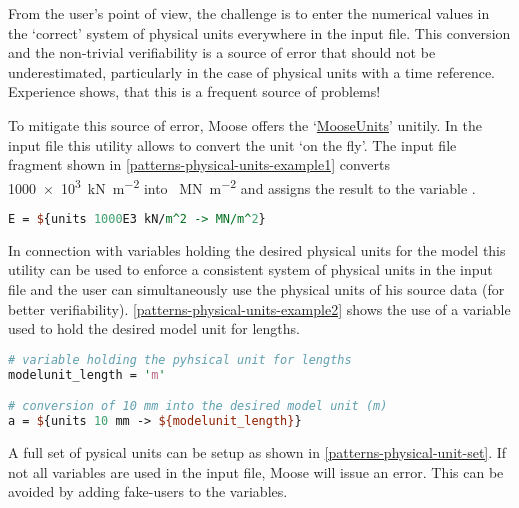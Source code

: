 From the user's point of view, the challenge is to enter the numerical values
in the ‘correct’ system of physical units everywhere in the input file. This
conversion and the non-trivial verifiability is a source of error that should
not be underestimated, particularly in the case of physical units with a time
reference. Experience shows, that this is a frequent source of problems!

To mitigate this source of error, Moose offers the
‘\href{https://mooseframework.inl.gov/source/utils/Units.html}{MooseUnits}’
unitily. In the input file this utility allows to convert the unit ‘on the
fly’. The input file fragment shown in
\autoref{patterns-physical-units-example1} converts \SI{1000e3}{\kN\per\m^2}
into \SI{}{\MN\per\m^2} and assigns the result to the variable .

\begin{lstlisting}[language=perl, caption={Converting \SI{1000e3}{\kN\per\m^2} into
    \SI{}{\MN\per\m^2}},label={patterns-physical-units-example1}]
E = ${units 1000E3 kN/m^2 -> MN/m^2}
\end{lstlisting}

In connection with variables holding the desired physical units for the model
this utility can be used to enforce a consistent system of physical units in
the input file and the user can simultaneously use the physical units of his
source data (for better verifiability).
\autoref{patterns-physical-units-example2} shows the use of a variable used to
hold the desired model unit for lengths.

\begin{lstlisting}[language=perl, caption={Using a variable to hold the physical unit for lengths},label={patterns-physical-units-example2}]
# variable holding the pyhsical unit for lengths
modelunit_length = 'm'

# conversion of 10 mm into the desired model unit (m)
a = ${units 10 mm -> ${modelunit_length}}
\end{lstlisting}

A full set of pysical units can be setup as shown in
\autoref{patterns-physical-unit-set}. If not all variables are used in the
input file, Moose will issue an error. This can be avoided by adding fake-users
to the variables.

